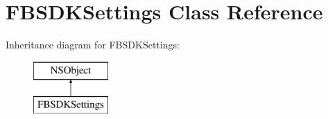 \hypertarget{interface_f_b_s_d_k_settings}{}\section{F\+B\+S\+D\+K\+Settings Class Reference}
\label{interface_f_b_s_d_k_settings}
Inheritance diagram for F\+B\+S\+D\+K\+Settings\+:\begin{figure}[H]
\begin{center}
\leavevmode
\includegraphics[height=2.000000cm]{interface_f_b_s_d_k_settings}
\end{center}
\end{figure}
